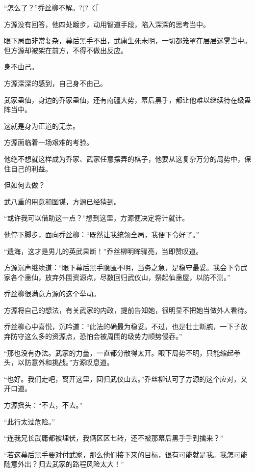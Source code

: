 
\begin{this_body}

“怎么了？”乔丝柳不解。?(?〈［

方源没有回答，他四处踱步，动用智道手段，陷入深深的思考当中。

眼下局面非常复杂，幕后黑手不出，武庸生死未明，一切都笼罩在层层迷雾当中。但方源却被架在前方，不得不做出反应。

身不由己。

方源深深的感到，自己身不由己。

武家蛊仙，身边的乔家蛊仙，还有南疆大势，幕后黑手，都让他难以继续待在级蛊阵当中。

这就是身为正道的无奈。

方源面临着一场艰难的考验。

他绝不想就这样成为乔家、武家任意摆弄的棋子，他要从这复杂万分的局势中，保住自己的利益。

但如何去做？

武八重的用意和图谋，方源已经猜到。

“或许我可以借助这一点？”想到这里，方源便决定将计就计。

他停下脚步，面向乔丝柳：“既然让我统领全局，我便下令好了。”

“遗海，这才是男儿的英武果断！”乔丝柳明眸骤亮，当即赞叹道。

方源沉声继续道：“眼下幕后黑手隐匿不明，当务之急，是稳守最妥。我会下令武家各个蛊仙，放弃外围资源点，尽数回归武仪山，祭起仙蛊屋，以防不测。”

乔丝柳很满意方源的这个举动。

方源将自己的想法，有关武家的内政，提前告知她，很明显不把她当做外人看待。

乔丝柳心中喜悦，沉吟道：“此法的确最为稳妥。不过，也是壮士断腕，一下子放弃防守这么多的资源点，恐怕会被周围的级势力顺势侵吞。”

“那也没有办法。武家的力量，一直都分散得太开。眼下局势不明，只能缩起拳头，以防意外和挑战。”方源叹息道。

“也好。我们走吧，离开这里，回归武仪山去。”乔丝柳认可了方源的这个应对，又开口道。

方源摇头：“不去，不去。”

“此行太过危险。”

“连我兄长武庸都被埋伏，我俩区区七转，还不被那幕后黑手手到擒来？”

“若这幕后黑手要对付武家，那么他们接下来的目标，很有可能就是我。我怎可能随意外出？归去武家的路程风险太大！”


\end{this_body}
